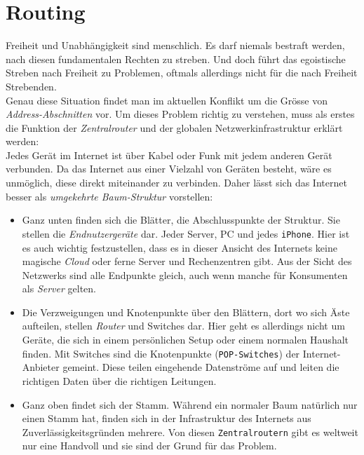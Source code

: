 \documentclass[11pt]{report}
\begin{document}
\section{Routing}
\label{sec:org23e5617}
\noindent Freiheit und Unabhängigkeit sind menschlich. Es darf niemals
bestraft werden, nach diesen fundamentalen Rechten zu streben. Und
doch führt das egoistische Streben nach Freiheit zu Problemen, oftmals
allerdings nicht für die nach Freiheit Strebenden.\\

\noindent Genau diese Situation findet man im aktuellen Konflikt um
die Grösse von \emph{Address-Abschnitten} vor. Um dieses Problem richtig zu
verstehen, muss als erstes die Funktion der \emph{Zentralrouter} und der
globalen Netzwerkinfrastruktur erklärt werden:\\

\noindent Jedes Gerät im Internet ist über Kabel oder Funk mit jedem
anderen Gerät verbunden. Da das Internet aus einer Vielzahl von
Geräten besteht, wäre es unmöglich, diese direkt miteinander zu
verbinden. Daher lässt sich das Internet besser als \emph{umgekehrte
Baum-Struktur} vorstellen:
\begin{itemize}
\item Ganz unten finden sich die Blätter, die Abschlusspunkte der
Struktur. Sie stellen die \emph{Endnutzergeräte} dar. Jeder Server, PC und
jedes \texttt{iPhone}. Hier ist es auch wichtig festzustellen, dass es in
dieser Ansicht des Internets keine magische \emph{Cloud} oder ferne Server
und Rechenzentren gibt. Aus der Sicht des Netzwerks sind alle
Endpunkte gleich, auch wenn manche für Konsumenten als \emph{Server}
gelten.
\item Die Verzweigungen und Knotenpunkte über den Blättern, dort wo sich
Äste aufteilen, stellen \emph{Router} und Switches dar. Hier geht es
allerdings nicht um Geräte, die sich in einem persönlichen Setup
oder einem normalen Haushalt finden. Mit Switches sind die
Knotenpunkte (\texttt{POP-Switches}) der Internet-Anbieter gemeint. Diese
teilen eingehende Datenströme auf und leiten die richtigen Daten
über die richtigen Leitungen.
\item Ganz oben findet sich der Stamm. Während ein normaler Baum natürlich
nur einen Stamm hat, finden sich in der Infrastruktur des Internets
aus Zuverlässigkeitsgründen mehrere. Von diesen \texttt{Zentralroutern} gibt
es weltweit nur eine Handvoll und sie sind der Grund für das
Problem.
\end{itemize}
\end{document}
